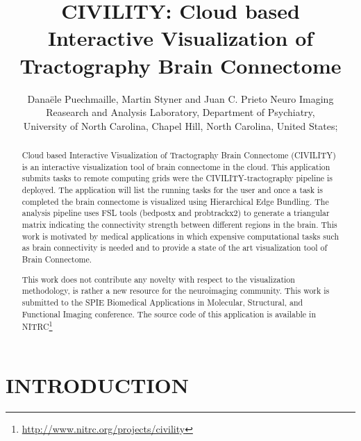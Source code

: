 \documentclass[]{spie}  %
\title{CIVILITY: Cloud based Interactive Visualization of Tractography Brain Connectome}
\author{Dana\"{e}le Puechmaille\supit{a}, Martin Styner\supit{a} and Juan C. Prieto\supit{a}
\skiplinehalf
\supit{a}Neuro Imaging Reasearch and Analysis Laboratory, Department of Psychiatry, \\
 University of North Carolina, Chapel Hill, North Carolina, United States;
}
\begin{document}
 
  \maketitle 

\begin{abstract}

Cloud based Interactive Visualization of Tractography Brain Connectome (CIVILITY) is an interactive visualization tool of brain connectome in the cloud. This application submits tasks to remote computing grids were the CIVILITY-tractography pipeline is deployed. 
The application will list the running tasks for the user and once a task is completed the brain connectome is visualized using Hierarchical Edge Bundling. 
The analysis pipeline uses FSL tools (bedpostx and probtrackx2) to generate a triangular matrix indicating 
the connectivity strength between different regions in the brain.
This work is motivated by medical applications in which expensive computational tasks such as brain connectivity is needed and to provide 
a state of the art visualization tool of Brain Connectome. 

This work does not contribute any novelty with respect to the visualization methodology, is rather a new resource for the neuroimaging community.
This work is submitted to the SPIE Biomedical Applications in Molecular, Structural, and Functional Imaging conference. 
The source code of this application is available in NITRC\footnote{\url{http://www.nitrc.org/projects/civility}}

\end{abstract}



\section{INTRODUCTION}
\label{sec:intro}
\end{document}
